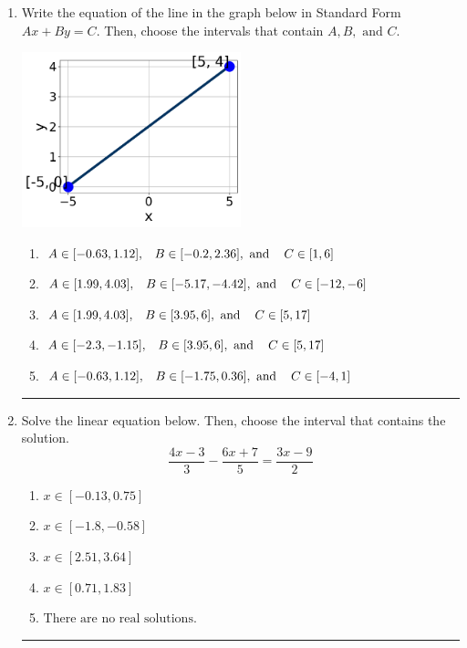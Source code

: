 \documentclass[14pt]{extbook}
\newcommand{\litem}[1]{\item#1\hspace*{-1cm}\rule{\textwidth}{0.4pt}}
\begin{document}
\begin{enumerate}
{\begin{enumerate}[label=\Alph*.]
\end{enumerate} }
\litem{
Write the equation of the line in the graph below in Standard Form $Ax+By=C$. Then, choose the intervals that contain $A, B, \text{ and } C$.
\begin{center}
    \includegraphics[width=0.5\textwidth]{../Figures/linearGraphToStandardC.png}
\end{center}
\begin{enumerate}[label=\Alph*.]
\item \( A \in [-0.63, 1.12], \hspace{3mm} B \in [-0.2, 2.36], \text{ and } \hspace{3mm} C \in [1, 6] \)
\item \( A \in [1.99, 4.03], \hspace{3mm} B \in [-5.17, -4.42], \text{ and } \hspace{3mm} C \in [-12, -6] \)
\item \( A \in [1.99, 4.03], \hspace{3mm} B \in [3.95, 6], \text{ and } \hspace{3mm} C \in [5, 17] \)
\item \( A \in [-2.3, -1.15], \hspace{3mm} B \in [3.95, 6], \text{ and } \hspace{3mm} C \in [5, 17] \)
\item \( A \in [-0.63, 1.12], \hspace{3mm} B \in [-1.75, 0.36], \text{ and } \hspace{3mm} C \in [-4, 1] \)

\end{enumerate} }
\litem{
Solve the linear equation below. Then, choose the interval that contains the solution.\[ \frac{4x -3}{3} - \frac{6x + 7}{5} = \frac{3x -9}{2} \]\begin{enumerate}[label=\Alph*.]
\item \( x \in [-0.13, 0.75] \)
\item \( x \in [-1.8, -0.58] \)
\item \( x \in [2.51, 3.64] \)
\item \( x \in [0.71, 1.83] \)
\item \( \text{There are no real solutions.} \)


\end{enumerate}}
\end{enumerate}
\end{document}
